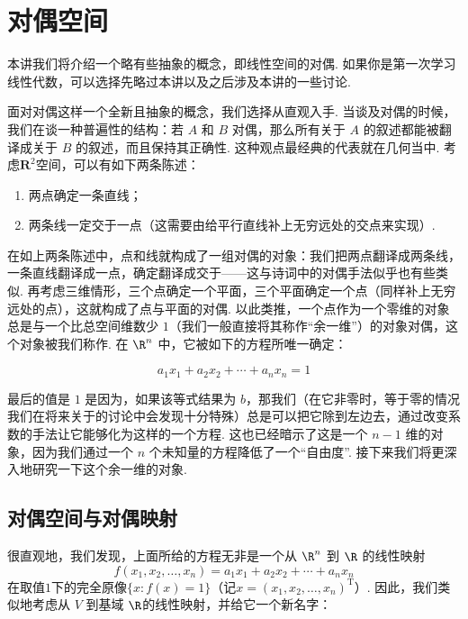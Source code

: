 \chapter{对偶空间} \label{chap:对偶空间}

本讲我们将介绍一个略有些抽象的概念，即线性空间的对偶. 如果你是第一次学习线性代数，可以选择先略过本讲以及之后涉及本讲的一些讨论.

面对对偶这样一个全新且抽象的概念，我们选择从直观入手. 当谈及对偶的时候，我们在谈一种普遍性的结构：若 $A$ 和 $B$ 对偶，那么所有关于 $A$ 的叙述都能被翻译成关于 $B$ 的叙述，而且保持其正确性. 这种观点最经典的代表就在几何当中. 考虑$\mathbf{R}^2$空间，可以有如下两条陈述：

\begin{enumerate}
    \item 两点确定一条直线；
    \item 两条线一定交于一点（这需要由给平行直线补上无穷远处的交点来实现）.
\end{enumerate}

在如上两条陈述中，点和线就构成了一组对偶的对象：我们把两点翻译成两条线，一条直线翻译成一点，确定翻译成交于——这与诗词中的对偶手法似乎也有些类似. 再考虑三维情形，三个点确定一个平面，三个平面确定一个点（同样补上无穷远处的点），这就构成了点与平面的对偶. 以此类推，一个点作为一个零维的对象总是与一个比总空间维数少 $1$（我们一般直接将其称作``余一维''）的对象对偶，这个对象被我们称作. 在 $\R^n$ 中，它被如下的方程所唯一确定：

\[a_1 x_1 + a_2 x_2 + \cdots + a_n x_n = 1\]

最后的值是 $1$ 是因为，如果该等式结果为 $b$，那我们（在它非零时，等于零的情况我们在将来关于的讨论中会发现十分特殊）总是可以把它除到左边去，通过改变系数的手法让它能够化为这样的一个方程. 这也已经暗示了这是一个 $n-1$ 维的对象，因为我们通过一个 $n$ 个未知量的方程降低了一个``自由度''. 接下来我们将更深入地研究一下这个余一维的对象.

\section{对偶空间与对偶映射}

很直观地，我们发现，上面所给的方程无非是一个从 $\R^n$ 到 $\R$ 的线性映射
\begin{equation}\label{eq:6:线性泛函与超平面对应}
    f(x_1, x_2, \ldots, x_n) = a_1 x_1 + a_2 x_2 + \cdots + a_n x_n
\end{equation}
在取值$1$下的完全原像$\{x: f(x) = 1\}$（记$x=(x_1,x_2,\ldots,x_n)^{\mathrm{T}}$）. 因此，我们类似地考虑从 $V$ 到基域 $\R$的线性映射，并给它一个新名字：

